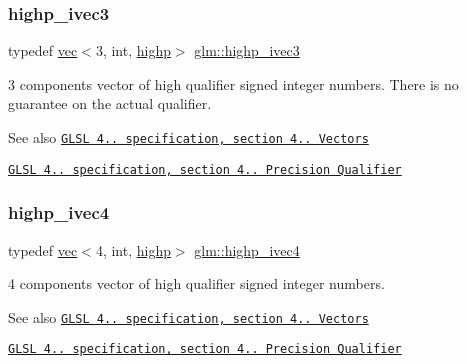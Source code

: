 \subsubsection{\texorpdfstring{highp\+\_\+ivec3}{highp\_ivec3}}
{\footnotesize\ttfamily typedef \hyperlink{structglm_1_1vec}{vec}$<$3, int, \hyperlink{namespaceglm_a36ed105b07c7746804d7fdc7cc90ff25ac6f7eab42eacbb10d59a58e95e362074}{highp}$>$ \hyperlink{group__core__precision_ga52ba3edf3183078cf4129e6193b32a2c}{glm\+::highp\+\_\+ivec3}}

3 components vector of high qualifier signed integer numbers. There is no guarantee on the actual qualifier.

\begin{DoxySeeAlso}{See also}
\href{http://www.opengl.org/registry/doc/GLSLangSpec.4.20.8.pdf}{\tt G\+L\+SL 4.. specification, section 4.. Vectors} 

\href{http://www.opengl.org/registry/doc/GLSLangSpec.4.20.8.pdf}{\tt G\+L\+SL 4.. specification, section 4.. Precision Qualifier} 
\end{DoxySeeAlso}
\mbox{\label{group__core__precision_gaff761e336e3b52f04e725fa85c6d36d1}} 
\subsubsection{\texorpdfstring{highp\+\_\+ivec4}{highp\_ivec4}}
{\footnotesize\ttfamily typedef \hyperlink{structglm_1_1vec}{vec}$<$4, int, \hyperlink{namespaceglm_a36ed105b07c7746804d7fdc7cc90ff25ac6f7eab42eacbb10d59a58e95e362074}{highp}$>$ \hyperlink{group__core__precision_gaff761e336e3b52f04e725fa85c6d36d1}{glm\+::highp\+\_\+ivec4}}

4 components vector of high qualifier signed integer numbers.

\begin{DoxySeeAlso}{See also}
\href{http://www.opengl.org/registry/doc/GLSLangSpec.4.20.8.pdf}{\tt G\+L\+SL 4.. specification, section 4.. Vectors} 

\href{http://www.opengl.org/registry/doc/GLSLangSpec.4.20.8.pdf}{\tt G\+L\+SL 4.. specification, section 4.. Precision Qualifier} 
\end{DoxySeeAlso}
\mbox{\label{group__core__precision_gae7066dac53a008363d6faeabf46ccb03}} 
